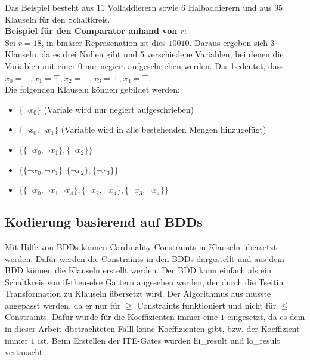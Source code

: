 \documentclass[a4,abstract=on]{scrartcl}
\begin{document}
Das Beispiel besteht aus $11$ Volladdierern sowie 6 Halbaddierern und aus $95$ Klauseln für den Schaltkreis.\\

\textbf{Beispiel für den Comparator anhand von $r$}:\\
Sei $r = 18$, in binärer Repräsenation ist dies $10010$. Daraus ergeben sich 3 Klauseln, da es drei Nullen gibt und 5 verschiedene Variablen, bei denen die Variablen mit einer $0$ nur negiert aufgeschrieben werden. Das bedeutet, dass $x_0 = \bot, x_1 = \top, x_2 = \bot, x_3 = \bot, x_4 = \top$.\\
Die folgenden Klauseln können gebildet werden:\\
\begin{itemize}
\item $\{\neg x_0\}$ (Variale wird nur negiert aufgeschrieben)
\item  $\{\neg x_0,\neg x_1\}$ (Variable wird in alle bestehenden Mengen hinzugefügt)
\item $\{\{\neg x_0, \neg x_1\},\{\neg x_2\}\}$
\item $\{\{\neg x_0, \neg x_1\},\{\neg x_2\}, \{\neg x_3\}\}$
\item $\{\{\neg x_0, \neg x_1\, \neg x_4\},\{\neg x_2, \neg x_4\}, \{\neg x_3, \neg x_4\}\}$
\end{itemize}


	\subsection{Kodierung basierend auf BDDs}
Mit Hilfe von BDDs können Cardinality Constraints in Klauseln übersetzt werden. Dafür werden die Constraints in den BDDs dargestellt und aus dem BDD können die Klauseln erstellt werden. Der BDD kann einfach als ein Schaltkreis von if-then-else Gattern angesehen werden, der durch die Tseitin Transformation zu Klauseln übersetzt wird. Der Algorithmus aus \cite[][Seite 11]{niklasse} musste angepasst werden, da er nur für $\geq$ Constraints funktioniert und nicht für $\leq$ Constraints. Dafür wurde für die Koeffizienten  immer eine $1$ eingesetzt, da es dem in dieser Arbeit dbetrachteten Falll keine Koeffizienten gibt, bzw. der Koeffizient immer $1$ ist. Beim Erstellen der ITE-Gates wurden hi\_result und lo\_result vertauscht.\\
\end{document}
